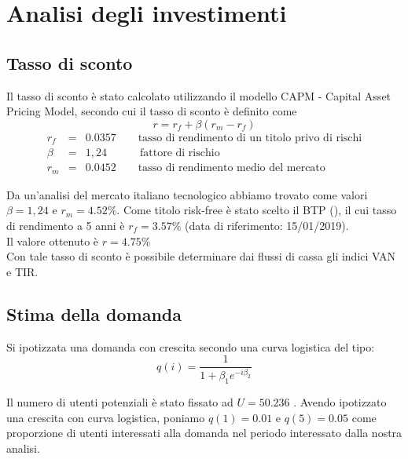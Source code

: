 \section{Analisi degli investimenti}
\subsection{Tasso di sconto}
Il tasso di sconto è stato calcolato utilizzando il modello CAPM - Capital Asset
Pricing Model, secondo cui il tasso di sconto è definito come
\begin{displaymath}
r = r_f + \beta (r_m - r_f )
\end{displaymath}
\begin{eqnarray*}
r_f &=& 0.0357 \qquad \mbox{tasso di rendimento di un titolo privo di rischi} \\ 
\beta &=& 1,24 \quad\qquad \mbox{fattore di rischio} \\
r_m &=& 0.0452 \qquad \mbox{tasso di rendimento medio del mercato}
\end{eqnarray*}

Da un’analisi del mercato italiano tecnologico abbiamo trovato come valori
$\beta=1,24$ e $r_m=4.52\%$. Come titolo risk-free è stato scelto il BTP
(\cite{finmer}), il cui tasso di rendimento a 5 anni è $r_f=3.57\%$ (data di
riferimento: 15/01/2019).\\ 
Il valore ottenuto è $r = 4.75\%$\\
Con tale tasso di sconto è possibile determinare dai flussi di cassa gli indici
VAN e TIR.
\subsection{Stima della domanda}
Si ipotizzata una domanda con crescita secondo una curva logistica del tipo: 
\begin{displaymath}
q(i) = \frac{1}{1 + \beta_1 e^{-i\beta_2}}
\end{displaymath}

Il numero di utenti potenziali è stato fissato ad $U=50.236$ \cite{miele}.
Avendo ipotizzato una crescita con curva logistica, poniamo $q(1)=0.01$ e
$q(5)=0.05$ come proporzione di utenti interessati alla domanda nel periodo
interessato dalla nostra analisi.  

